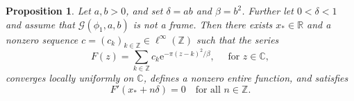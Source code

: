 \documentclass[11pt]{amsart}
\numberwithin{equation}{section}
\newtheorem{proposition}[theorem]{Proposition}
\theoremstyle{definition}
\theoremstyle{remark}
\newcommand{\R}{\mathbb R}
\newcommand{\C}{\mathbb C}
\newcommand{\Z}{\mathbb Z}
\newcommand{\e}{\mathrm e}
\newcommand{\cG}{\mathcal G}
\begin{document}
\begin{proposition}\label{prop:nonframe-reduction}
    Let $a,b>0$, and set $\delta=ab$ and $\beta=b^2$. Further let $0<\delta<1$ and assume that $\cG(\phi_1,a,b)$ is not a frame. Then there exists $x_*\in\R$ and a nonzero sequence $c=(c_k)_{k\in\Z}\in\ell^\infty(\Z)$ such that the series
    \begin{equation}\label{eq:F-def}
        F(z)=\sum_{k\in\Z}c_k\e^{-\pi(z-k)^2/\beta},
        \quad  \text{ for } z\in\C,
    \end{equation} 
    converges locally uniformly on $\C$, defines a nonzero entire function, and satisfies
    \begin{equation}\label{eq:critical-grid}
        F'(x_*+n\delta)=0
        \quad\text{for all }n\in\Z.
    \end{equation} 
    \end{proposition}
\end{document}
